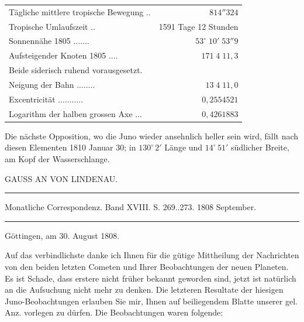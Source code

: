 \begin{center}\fontsize{9}{11}\selectfont\setlength{\tabcolsep}{3pt}\renewcommand{\arraystretch}{1.15}\begin{tabular}{lr}
Tägliche mittlere tropische Bewegung .\;.\; & $814''324$\\
Tropische Umlaufszeit .\;.\; & 1591 Tage 12 Stunden\\
Sonnennähe 1805 .\;.\;.\;.\;.\;.\;.\; & $53^\circ\;10'\;53''9$\\
Aufsteigender Knoten 1805 .\;.\;.\;.\; & $171\;4\;11{,}3$\\
\multicolumn{2}{l}{\quad Beide siderisch ruhend vorausgesetzt.}\\
Neigung der Bahn .\;.\;.\;.\;.\;.\;.\;.\; & $13\;4\;11{,}0$\\
Excentricität .\;.\;.\;.\;.\;.\;.\;.\;.\;.\;.\; & $0{,}2554521$\\
Logarithm der halben grossen Axe .\;.\;.\; & $0{,}4261883$\\
\end{tabular}\end{center}


\par\indent Die nächste Opposition, wo die Juno wieder ansehnlich heller sein wird, fällt nach diesen Elementen 1810 Januar 30; in $130^\circ\,2'$ Länge und $14^\circ\,51'$ südlicher Breite, am Kopf der Wasserschlange.

\begin{center}
GAUSS AN VON LINDENAU.
\end{center}

\hrule
\begin{center}
\fontsize{10}{12}\selectfont Monatliche Correspondenz. Band XVIII. S. 269..273. 1808 September.
\end{center}
\hrule

\begin{flushright}
Göttingen, am 30. August 1808.
\end{flushright}

\par\indent Auf das verbindlichste danke ich Ihnen für die gütige Mittheilung der Nachrichten von den beiden letzten Cometen und Ihrer Beobachtungen der neuen Planeten. Es ist Schade, dass erstere nicht
früher bekannt geworden sind, jetzt ist natürlich an die Aufsuchung nicht mehr zu denken. Die letzteren Resultate der hiesigen Juno-Beobachtungen erlauben Sie mir, Ihnen auf beiliegendem Blatte unserer gel. Anz. vorlegen zu dürfen. Die Beobachtungen waren folgende:


